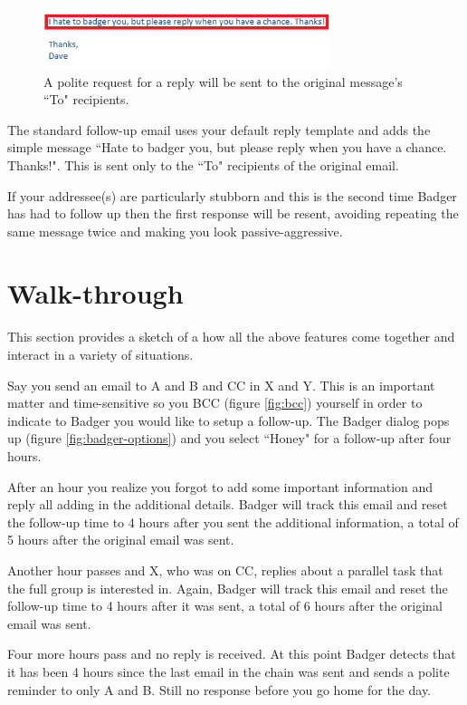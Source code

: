 \documentclass[12pt]{article}
\begin{document}
\begin{figure}
    \centering
    \includegraphics[width=0.75\textwidth]{message}
    \caption{A polite request for a reply will be sent to the original message's ``To" recipients.}
    \label{fig:message}
\end{figure}

The standard follow-up email uses your default reply template and adds the simple message ``Hate to badger you, but please reply when you have a chance. Thanks!". This is sent only to the ``To" recipients of the original email.

If your addressee(s) are particularly stubborn and this is the second time Badger has had to follow up then the first response will be resent, avoiding repeating the same message twice and making you look passive-aggressive. 

\section{Walk-through}
\label{sec:walk-through}

This section provides a sketch of a how all the above features come together and interact in a variety of situations.

Say you send an email to A and B and CC in X and Y.  This is an important matter and time-sensitive so you BCC (figure \ref{fig:bcc}) yourself in order to indicate to Badger you would like to setup a follow-up.  The Badger dialog pops up (figure \ref{fig:badger-options}) and you select ``Honey" for a follow-up after four hours.  

After an hour you realize you forgot to add some important information and reply all adding in the additional details. Badger will track this email and reset the follow-up time to 4 hours after you sent the additional information, a total of 5 hours after the original email was sent.

Another hour passes and X, who was on CC, replies about a parallel task that the full group is interested in. Again, Badger will track this email and reset the follow-up time to 4 hours after it was sent, a total of 6 hours after the original email was sent.

Four more hours pass and no reply is received.  At this point Badger detects that it has been 4 hours since the last email in the chain was sent and sends a polite reminder to only A and B. Still no response before you go home for the day.
\end{document}
